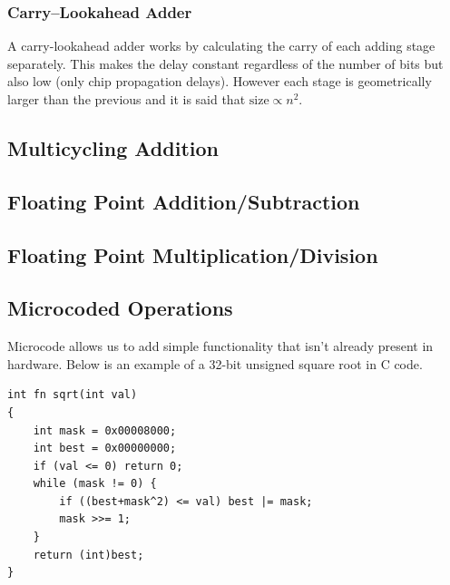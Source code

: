 \subsubsection*{Carry--Lookahead Adder}
A carry-lookahead adder works by calculating the carry of each adding stage separately. This makes the delay constant regardless of the number of bits but also  low (only chip propagation delays). However each stage is geometrically larger than the previous and it is said that $\mbox{size} \propto n^2$.


\subsection{Multicycling Addition}
\subsection{Floating Point Addition/Subtraction}
\subsection{Floating Point Multiplication/Division}

\subsection{Microcoded Operations}
Microcode allows us to add simple functionality that isn't already present in hardware. Below is an example of a 32-bit unsigned square root in C code.

\begin{verbatim}
int fn sqrt(int val)
{
    int mask = 0x00008000;
    int best = 0x00000000;
    if (val <= 0) return 0;
    while (mask != 0) {
        if ((best+mask^2) <= val) best |= mask;
        mask >>= 1;
    }
    return (int)best;
}
\end{verbatim}





